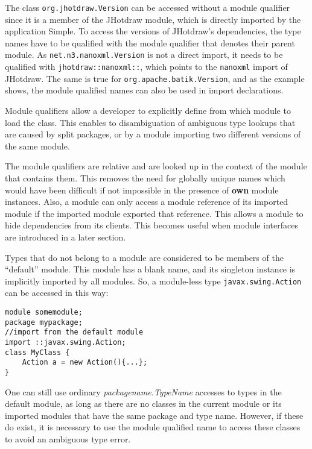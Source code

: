 The class \texttt{org.jhotdraw.Version} can be accessed without
a module qualifier since it is a member of the JHotdraw module, 
which is directly imported by the application Simple. To access
the versions of JHotdraw's dependencies, the type names have to
be qualified with the module qualifier that denotes their parent
module. As \texttt{net.n3.nanoxml.Version} is not a direct import,
it needs to be qualified with \texttt{jhotdraw::nanoxml::}, which
points to the \texttt{nanoxml} import of JHotdraw. The same is
true for \texttt{org.apache.batik.Version}, and as the example shows,
the module qualified names can also be used in import declarations.

Module qualifiers allow a developer to explicitly define from which module
to load the class. This enables to disambiguation of ambiguous type
lookups that are caused by split packages, or by a module importing
two different versions of the same module.

The module qualifiers are relative and are looked up in the context 
of the module that contains them. This removes the need for globally
unique names which would have been difficult if not impossible in the
presence of \textbf{own} module instances. Also, a module can only
access a module reference of its imported module if the imported module
exported that reference. This allows a module to hide dependencies from
its clients. This becomes useful when module interfaces are introduced
in a later section.

Types that do not belong to a module are considered to be members of
the ``default'' module. This module has a blank name, and its singleton
instance is implicitly imported by all modules. So, a module-less
type {\tt javax.swing.Action} can be accessed in this way:

\begin{lstlisting}[caption=Default Module Lookups]
module somemodule;
package mypackage;
//import from the default module
import ::javax.swing.Action;
class MyClass {
	Action a = new Action(){...};
}
\end{lstlisting}

One can still use ordinary \textit{packagename.TypeName} accesses to types in
the default module, as long as there are no classes in the current module
or its imported modules that have the same package and type name. However,
if these do exist, it is necessary to use the module qualified name to access
these classes to avoid an ambiguous type error.


